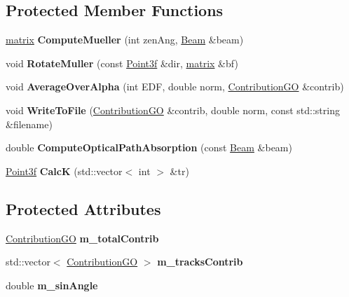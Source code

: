 \subsection*{Protected Member Functions}
\begin{DoxyCompactItemize}
\item 
\mbox{\label{class_handler_g_o_a5e2e96b14ef9e4152e0b141b68b33cba}} 
\mbox{\hyperlink{classmatrix}{matrix}} {\bfseries Compute\+Mueller} (int zen\+Ang, \mbox{\hyperlink{class_beam}{Beam}} \&beam)
\item 
\mbox{\label{class_handler_g_o_aad730fa5c3975f3fdff91d4e376d3ec8}} 
void {\bfseries Rotate\+Muller} (const \mbox{\hyperlink{struct_point3f}{Point3f}} \&dir, \mbox{\hyperlink{classmatrix}{matrix}} \&bf)
\item 
\mbox{\label{class_handler_g_o_aa0cbf44e161a8c194eae8f9d6e484b25}} 
void {\bfseries Average\+Over\+Alpha} (int E\+DF, double norm, \mbox{\hyperlink{class_contribution_g_o}{Contribution\+GO}} \&contrib)
\item 
\mbox{\label{class_handler_g_o_a287fa480c7124872fc1cd251e7db8c5f}} 
void {\bfseries Write\+To\+File} (\mbox{\hyperlink{class_contribution_g_o}{Contribution\+GO}} \&contrib, double norm, const std\+::string \&filename)
\item 
\mbox{\label{class_handler_g_o_a4b3c47d02003912688d2aee60c274f21}} 
double {\bfseries Compute\+Optical\+Path\+Absorption} (const \mbox{\hyperlink{class_beam}{Beam}} \&beam)
\item 
\mbox{\label{class_handler_g_o_a189f1f533f10a64afa5b9aac207d85fe}} 
\mbox{\hyperlink{struct_point3f}{Point3f}} {\bfseries CalcK} (std\+::vector$<$ int $>$ \&tr)
\end{DoxyCompactItemize}
\subsection*{Protected Attributes}
\begin{DoxyCompactItemize}
\item 
\mbox{\label{class_handler_g_o_afa1081e6a7cbdde1f843c90ddac65778}} 
\mbox{\hyperlink{class_contribution_g_o}{Contribution\+GO}} {\bfseries m\+\_\+total\+Contrib}
\item 
\mbox{\label{class_handler_g_o_ad381fe7c0a1c4031e46b8660a2cfe630}} 
std\+::vector$<$ \mbox{\hyperlink{class_contribution_g_o}{Contribution\+GO}} $>$ {\bfseries m\+\_\+tracks\+Contrib}
\item 
\mbox{\label{class_handler_g_o_a6c7a6e0a06070cc89495d0276092ed2f}} 
double {\bfseries m\+\_\+sin\+Angle}
\end{DoxyCompactItemize}
